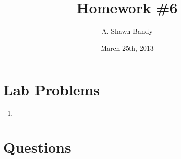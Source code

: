 \documentclass{article}
\begin{document}
\title{Homework \#6}
\author{A. Shawn Bandy}
\date{March 25th, 2013}
\maketitle
	\section{Lab Problems}
		\begin{enumerate}[L1]
			\item 
			
		\end{enumerate}
\begingroup
	\section{Questions}\hfill\\
		\let\clearpage\relax
		\begin{enumerate}[Q1]
			
			
		\end{enumerate}
\endgroup
\end{document}
